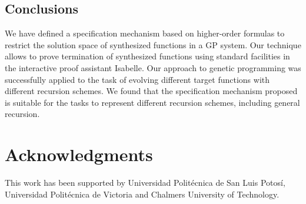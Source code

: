 

\subsection{Conclusions}
We have defined a specification mechanism based on higher-order formulas to restrict the solution space of synthesized functions in a GP system. Our technique allows to prove termination of synthesized functions using standard facilities in the interactive proof assistant Isabelle. Our approach to genetic programming was successfully applied to the task of evolving different target functions with different recursion schemes. We found that the specification mechanism proposed is suitable for the tasks to represent different recursion schemes, including general recursion.

\section*{Acknowledgments}
This work has been supported by Universidad Polit\'ecnica de San Luis Potos\'i, Universidad Polit\'ecnica de Victoria and Chalmers University of Technology.


%



